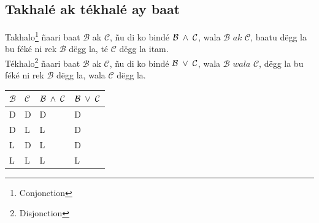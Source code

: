 \documentclass[twoside, a4paper]{article}
\begin{document}
\subsection{Takhalé ak tékhalé ay baat}
\begin{tcolorbox}[enhanced jigsaw,breakable,pad at break*=1mm, colback=red!5!white,colframe=white!75!black,title= Téeki\footnote{Définition},
    watermark color=white]
  Takhalo\footnote{Conjonction} ñaari baat $\mathcal{B}$ ak $\mathcal{C}$, ñu di ko bindé $\mathcal{B}\hspace{0.1cm}\land\hspace{0.1cm}\mathcal{C}$, wala $\mathcal{B} \textit{ ak } \mathcal{C}$, baatu dëgg la bu féké ni rek $\mathcal{B}$ dëgg la, té $\mathcal{C}$ dëgg la itam.\\

  Tékhalo\footnote{Disjonction} ñaari baat $\mathcal{B}$ ak $\mathcal{C}$, ñu di ko bindé $\mathcal{B}\hspace{0.1cm}\lor\hspace{0.1cm}\mathcal{C}$, wala $\mathcal{B} \textit{ wala } \mathcal{C}$, dëgg la bu féké ni rek $\mathcal{B}$ dëgg la, wala $\mathcal{C}$ dëgg la.\\

  \begin{tabularx}{0.8\textwidth} {
      | >{\centering\arraybackslash}X
      | >{\centering\arraybackslash}X
      | >{\centering\arraybackslash}X
      | >{\centering\arraybackslash}X |}
    \hline
    $\mathcal{B}$ & $\mathcal{C}$ & $\mathcal{B}\hspace{0.1cm}\land\hspace{0.1cm}\mathcal{C}$ & $\mathcal{B}\hspace{0.1cm}\lor\hspace{0.1cm}\mathcal{C}$ \\
    \hline
    D             & D             & D                                                         & D                                                        \\
    D             & L             & L                                                         & D                                                        \\
    L             & D             & L                                                         & D                                                        \\
    L             & L             & L                                                         & L                                                        \\
    \hline
  \end{tabularx}
\end{tcolorbox}
\end{document}

